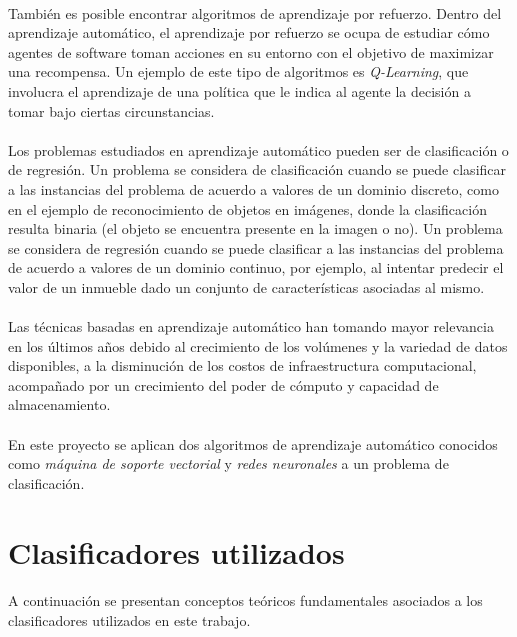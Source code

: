 \paragraph{}También es posible encontrar algoritmos de aprendizaje por refuerzo. Dentro del aprendizaje automático, el aprendizaje por refuerzo se ocupa de estudiar cómo agentes de software toman acciones en su entorno con el objetivo de maximizar una recompensa. Un ejemplo de este tipo de algoritmos es \textit{Q-Learning}, que involucra el aprendizaje de una política que le indica al agente la decisión a tomar bajo ciertas circunstancias.

\paragraph{}Los problemas estudiados en aprendizaje automático pueden ser de clasificación o de regresión. Un problema se considera de clasificación cuando se puede clasificar a las instancias del problema de acuerdo a valores de un dominio discreto, como en el ejemplo de reconocimiento de objetos en imágenes, donde la clasificación resulta binaria (el objeto se encuentra presente en la imagen o no). Un problema se considera de regresión cuando se puede clasificar a las instancias del problema de acuerdo a valores de un dominio continuo, por ejemplo, al intentar predecir el valor de un inmueble dado un conjunto de características asociadas al mismo.

\paragraph{}Las técnicas basadas en aprendizaje automático han tomando mayor relevancia en los últimos años debido al crecimiento de los volúmenes y la variedad de datos disponibles, a la disminución de los costos de infraestructura computacional, acompañado por un crecimiento del poder de cómputo y capacidad de almacenamiento.

\paragraph{}En este proyecto se aplican dos algoritmos de aprendizaje automático conocidos como \textit{máquina de soporte vectorial} y \textit{redes neuronales} a un problema de clasificación.

\section{Clasificadores utilizados}

\paragraph{}A continuación se presentan conceptos teóricos fundamentales asociados a los clasificadores utilizados en este trabajo.





